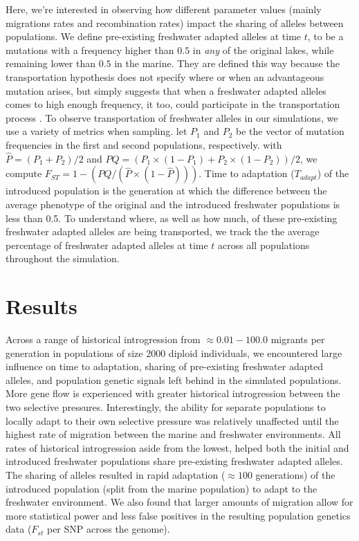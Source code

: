 \documentclass{article}
\begin{document}
Here, we're interested in observing how different parameter values
(mainly migrations rates and recombination rates)
impact the sharing of alleles between populations. 
We define pre-existing freshwater adapted alleles at time $t$,
to be a mutations with a frequency higher than $0.5$ in \textit{any} of the original lakes, 
while remaining lower than $0.5$ in the marine. 
They are defined this way because the transportation hypothesis does not specify where or when an advantageous mutation arises,
but simply suggests that when a freshwater adapted alleles comes to high enough frequency, it too, could participate in the transportation process \citep{schluter2009genetics}.
To observe transportation of freshwater alleles in our simulations, we use a variety of metrics when sampling.
let $P_{1}$ and $P_{2}$ be the vector of mutation frequencies in the first and second populations, respectively.
with $\hat{P} = (P_{1} + P_{2}) / 2$ and
$PQ = (P_{1} \times (1 - P_{1}) + P_{2} \times (1 - P_{2})) / 2$,
we compute $F_{ST} = 1 - (PQ / (\hat{P} \times (1 - \hat{P})))$.
Time to adaptation ($T_{adapt}$) of the introduced population is the generation at which
the difference between the average phenotype of the original and the introduced freshwater populations is less than 0.5. 
To understand where, as well as how much, of these pre-existing freshwater adapted alleles are being transported,
we track the the average percentage of freshwater adapted alleles at time $t$ across all populations throughout the simulation.


\section{Results}

Across a range of historical introgression from $\approx 0.01 - 100.0$ migrants per generation in populations of 
size 2000 diploid individuals, we encountered large influence on 
time to adaptation,
sharing of pre-existing freshwater adapted alleles,
and population genetic signals left behind in the simulated populations.
More gene flow is experienced with greater historical introgression between the two selective pressures.
Interestingly, the ability for separate populations to locally adapt to their own selective pressure was relatively unaffected 
until the highest rate of migration between the marine and freshwater environments.
All rates of historical introgression aside from the lowest, helped both the initial and introduced freshwater populations 
share pre-existing freshwater adapted alleles.
The sharing of alleles resulted in rapid adaptation ($\approx 100$ generations) of the introduced population (split from the marine population) to adapt to the freshwater environment.
We also found that larger amounts of migration allow for more statistical power and less false positives in the resulting population genetics data ($F_{st}$ per SNP across the genome).
\end{document}
